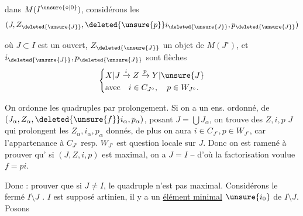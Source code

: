 
dans $M(I^{\unsure{\circ|0}})$, considérons les 
\[
 (J,Z_{\deleted{\unsure{J}}},\deleted{\unsure{p}}i_{\deleted{\unsure{J}}},p_{\deleted{\unsure{J}}})
\]

où $J\subset I$ est un ouvert, $Z_{\deleted{\unsure{J}}}$ un objet de $M(J^\circ)$, et $i_{\deleted{\unsure{J}}},p_{\deleted{\unsure{J}}}$ sont  flèches
\[
 \left\{\begin{aligned}
 &X|J\xrightarrow{i} Z\xrightarrow{p}Y|{\unsure{J}}\\
 &\text{avec}\quad i\in C_{J^\circ},\quad p\in W_{J^\circ}.
 \end{aligned}\right.
\]

On ordonne les quadruples par prolongement. Si on a un ens.  ordonné, de $(J_\alpha,Z_\alpha,\deleted{\unsure{f}}i_\alpha,p_\alpha)$, posant $J=\bigcup J_\alpha$, on trouve des $Z,i,p$    $J$ qui prolongent les $Z_\alpha,i_\alpha,p_\alpha$ donnés, de plus on aura $i\in C_{J^\circ},p\in W_{J^\circ}$, car l'appartenance à  $C_{J^\circ}$ resp. $W_{J^\circ}$ est question locale sur $J$. Donc  on est ramené à prouver qu' si $(J,Z,i,p)$ est maximal, on a $J=I$ -- d'où la factorisation voulue $f=pi$.

Donc : prouver que si $J\ne I$, le quadruple n'est pas maximal. Considérons le fermé  $I\setminus J$ . $I$ est supposé artinien, il y a un \uline{élément minimal} $\unsure{i_0}$ de $I\setminus J$. Posons
